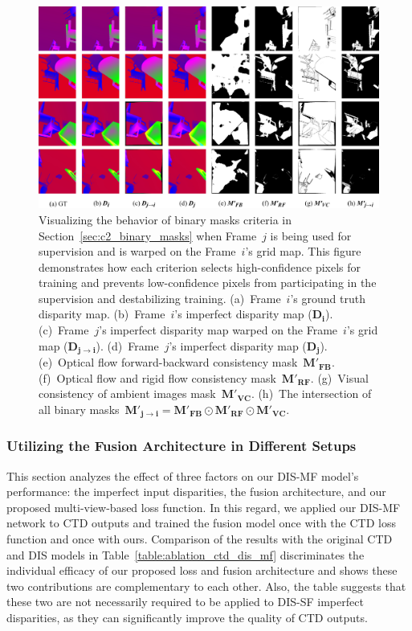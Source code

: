 \begin{figure}[t]
    \begin{center}
        \includegraphics[width=1.0\linewidth]{images/chapter2/supp_figures/visualize_masks.jpg}
    \end{center}
   \caption{Visualizing the behavior of binary masks criteria in Section~\ref{sec:c2_binary_masks} when Frame~$j$ is being used for supervision and is warped on the Frame~$i$'s grid map. This figure demonstrates how each criterion selects high-confidence pixels for training and prevents low-confidence pixels from participating in the supervision and destabilizing training. (a)~Frame~$i$'s ground truth disparity map. (b)~Frame~$i$'s imperfect disparity map ($\boldsymbol{D_{i}}$). (c)~Frame~$j$'s imperfect disparity map warped on the Frame~$i$'s grid map ($\boldsymbol{D_{j \rightarrow i}}$). (d)~Frame~$j$'s imperfect disparity map ($\boldsymbol{D_{j}}$). (e)~Optical flow forward-backward consistency mask~$\boldsymbol{M'_{FB}}$. (f)~Optical flow and rigid flow consistency mask~$\boldsymbol{M'_{RF}}$. (g)~Visual consistency of ambient images mask~$\boldsymbol{M'_{VC}}$. (h)~The intersection of all binary masks~$\boldsymbol{M'_{j \rightarrow i}} = \boldsymbol{M'_{FB}} \odot \boldsymbol{M'_{RF}} \odot \boldsymbol{M'_{VC}}$.}
    \label{fig:c2_visualize_masks}
\end{figure}

\subsubsection{Utilizing the Fusion Architecture in Different Setups}
This section analyzes the effect of three factors on our DIS-MF model's performance: the imperfect input disparities, the fusion architecture, and our proposed multi-view-based loss function. In this regard, we applied our DIS-MF network to CTD outputs and trained the fusion model once with the CTD loss function and once with ours. Comparison of the results with the original CTD and DIS models in Table~\ref{table:ablation_ctd_dis_mf} discriminates the individual efficacy of our proposed loss and fusion architecture and shows these two contributions are complementary to each other. Also, the table suggests that these two are not necessarily required to be applied to DIS-SF imperfect disparities, as they can significantly improve the quality of CTD outputs.

